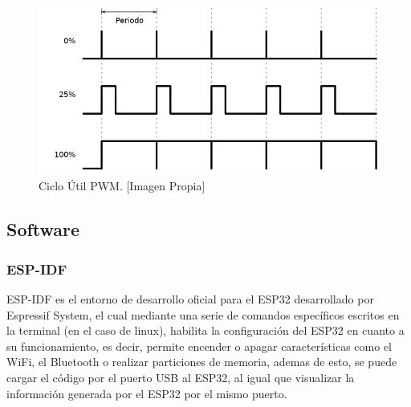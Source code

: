 \begin{figure}[!t]
	\centering
	\caption{Ciclo Útil PWM. [Imagen Propia] }
	\label{fig:pwm-duty-800x396}
	\includegraphics[width=0.6\linewidth]{Imagenes/pwm}
\end{figure}

\subsection{Software}

\subsubsection{ESP-IDF}

ESP-IDF es el entorno de desarrollo oficial para el ESP32 desarrollado por Espressif System, el cual mediante una serie de comandos específicos escritos en la terminal (en el caso de linux), habilita la configuración del ESP32 en cuanto a su funcionamiento, es decir, permite encender o apagar características como el WiFi, el Bluetooth o realizar particiones de memoria, ademas de esto, se puede cargar el código por el puerto USB al ESP32, al igual que visualizar la información generada por el ESP32 por el mismo puerto. \cite{ES}\\